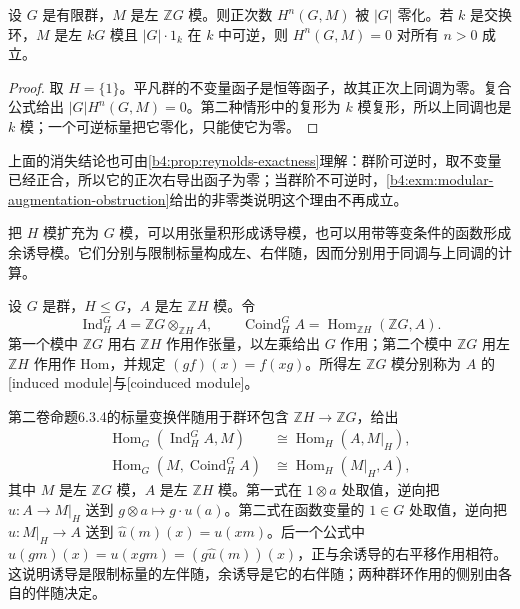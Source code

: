 \begin{corollary}\label{b4:cor:finite-group-torsion}
	设 \(G\) 是有限群，\(M\) 是左 \(\mathbb ZG\) 模。则正次数 \(H^n(G,M)\) 被 \(|G|\) 零化。若 \(k\) 是交换环，\(M\) 是左 \(kG\) 模且 \(|G|\cdot1_k\) 在 \(k\) 中可逆，则 \(H^n(G,M)=0\) 对所有 \(n>0\) 成立。
\end{corollary}
\begin{proof}
	取 \(H=\{1\}\)。平凡群的不变量函子是恒等函子，故其正次上同调为零。复合公式给出 \(|G|H^n(G,M)=0\)。第二种情形中的复形为 \(k\) 模复形，所以上同调也是 \(k\) 模；一个可逆标量把它零化，只能使它为零。
\end{proof}

上面的消失结论也可由\cref{b4:prop:reynolds-exactness}理解：群阶可逆时，取不变量已经正合，所以它的正次右导出函子为零；当群阶不可逆时，\cref{b4:exm:modular-augmentation-obstruction}给出的非零类说明这个理由不再成立。

\ProseParagraphBreak
把 \(H\) 模扩充为 \(G\) 模，可以用张量积形成诱导模，也可以用带等变条件的函数形成余诱导模。它们分别与限制标量构成左、右伴随，因而分别用于同调与上同调的计算。

\begin{definition}\label{b4:def:group-induction}
	设 \(G\) 是群，\(H\le G\)，\(A\) 是左 \(\mathbb ZH\) 模。令
	\[
		\operatorname{Ind}_H^G A=\mathbb ZG\otimes_{\mathbb ZH}A,\qquad \operatorname{Coind}_H^G A=\operatorname{Hom}_{\mathbb ZH}(\mathbb ZG,A).
	\]
	第一个模中 \(\mathbb ZG\) 用右 \(\mathbb ZH\) 作用作张量，以左乘给出 \(G\) 作用；第二个模中 \(\mathbb ZG\) 用左 \(\mathbb ZH\) 作用作 Hom，并规定 \((g f)(x)=f(xg)\)。所得左 \(\mathbb ZG\) 模分别称为 \(A\) 的[induced module]与[coinduced module]。
\end{definition}

第二卷命题6.3.4的标量变换伴随用于群环包含 \(\mathbb ZH\to\mathbb ZG\)，给出
\[
	\begin{aligned}
		\operatorname{Hom}_G(\operatorname{Ind}_H^GA,M) &\cong\operatorname{Hom}_H(A,M|_H),\\
		\operatorname{Hom}_G(M,\operatorname{Coind}_H^GA) &\cong\operatorname{Hom}_H(M|_H,A),
	\end{aligned}
\]
其中 \(M\) 是左 \(\mathbb ZG\) 模，\(A\) 是左 \(\mathbb ZH\) 模。第一式在 \(1\otimes a\) 处取值，逆向把 \(u:A\to M|_H\) 送到 \(g\otimes a\mapsto g\cdot u(a)\)。第二式在函数变量的 \(1\in G\) 处取值，逆向把 \(u:M|_H\to A\) 送到 \(\widehat u(m)(x)=u(xm)\)。后一个公式中 \(\widehat u(gm)(x)=u(xgm)=(g\widehat u(m))(x)\)，正与余诱导的右平移作用相符。这说明诱导是限制标量的左伴随，余诱导是它的右伴随；两种群环作用的侧别由各自的伴随决定。


